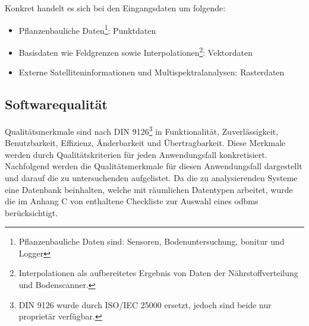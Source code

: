 
Konkret handelt es sich bei den Eingangsdaten um folgende:
\begin{itemize}
\item Pflanzenbauliche Daten\footnote{Pflanzenbauliche Daten sind: Sensoren, Bodenuntersuchung, \Gls{bonitur} und Logger}: Punktdaten
\item Basisdaten wie Feldgrenzen sowie Interpolationen\footnote{Interpolationen als aufbereitetes Ergebnis von Daten der Nährstoffverteilung und Bodenscanner.}: Vektordaten
\item Externe Satelliteninformationen und Multispektralanalysen: Rasterdaten
\end{itemize}

\subsection{Softwarequalität}
\label{softwarequalität}
Qualitätsmerkmale sind nach DIN 9126\footnote{DIN 9126 wurde durch ISO/IEC 25000 ersetzt, jedoch sind beide nur proprietär verfügbar.} in \cite[S.258 f.]{book:lehrbuchsoftware} Funktionalität, Zuverlässigkeit, Benutzbarkeit, Effizienz, Änderbarkeit und Übertragbarkeit.
Diese Merkmale werden durch Qualitätskriterien für jeden Anwendungsfall konkretisiert.
Nachfolgend werden die Qualitätsmerkmale für diesen Anwendungsfall dargestellt und darauf die zu untersuchenden aufgelistet.
Da die zu analysierenden Systeme eine Datenbank beinhalten, welche mit räumlichen Datentypen arbeitet, wurde die im Anhang C von \cite{book:objdbs} enthaltene Checkliste zur Auswahl eines \Gls{odbms} berücksichtigt.

